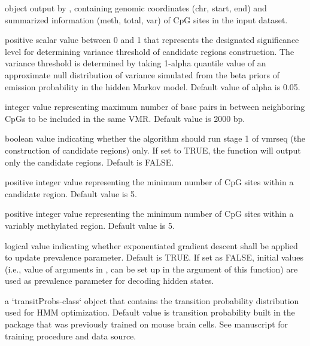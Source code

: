 \documentclass[letterpaper]{book}
\begin{document}
%
\begin{Arguments}
\begin{ldescription}
\item[\code{gr}]  object output by ,
containing genomic coordinates (chr, start, end) and summarized information
(meth, total, var) of CpG sites in the input dataset.

\item[\code{alpha}] positive scalar value between 0 and 1 that represents the
designated significance level for determining variance threshold of candidate
regions construction. The variance threshold is determined by taking 1-alpha
quantile value of an approximate null distribution of variance simulated
from the beta priors of emission probability in the hidden Markov model.
Default value of alpha is 0.05.

\item[\code{maxGap}] integer value representing maximum number of base pairs in
between neighboring CpGs to be included in the same VMR. Default value is
2000 bp.

\item[\code{stage1only}] boolean value indicating whether the algorithm should run
stage 1 of vmrseq (the construction of candidate regions) only. If set to TRUE,
the function will output only the candidate regions. Default is FALSE.

\item[\code{minNumCR}] positive integer value representing the minimum number of
CpG sites within a candidate region. Default value is 5.

\item[\code{minNumVMR}] positive integer value representing the minimum number of
CpG sites within a variably methylated region. Default value is 5.

\item[\code{gradient}] logical value indicating whether exponentiated gradient
descent shall be applied to update prevalence parameter. Default is TRUE. If
set as FALSE, initial values (i.e., value of  arguments in
, can be set up in the 
argument of this function) are used as prevalence parameter for decoding
hidden states.

\item[\code{tp}] a `transitProbs-class` object that contains the transition
probability distribution used for HMM optimization. Default value is
transition probability  built in the package that was
previously trained on mouse brain cells. See manuscript for training
procedure and data source.


\end{ldescription}
\end{Arguments}
\end{document}
